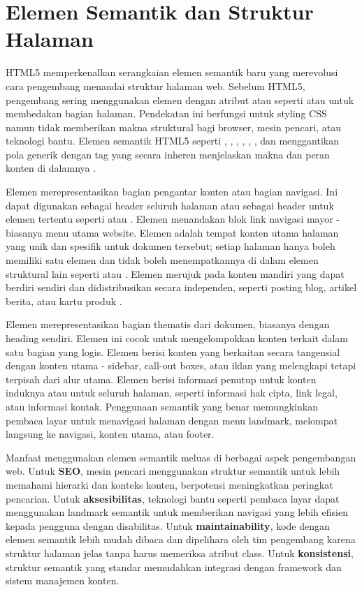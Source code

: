 ﻿\section{Elemen Semantik dan Struktur Halaman}

HTML5 memperkenalkan serangkaian elemen semantik baru yang merevolusi cara pengembang menandai struktur halaman web. Sebelum HTML5, pengembang sering menggunakan elemen  dengan atribut  atau  seperti  atau  untuk membedakan bagian halaman. Pendekatan ini berfungsi untuk styling CSS namun tidak memberikan makna struktural bagi browser, mesin pencari, atau teknologi bantu. Elemen semantik HTML5 seperti , , , , , , dan  menggantikan pola  generik dengan tag yang secara inheren menjelaskan makna dan peran konten di dalamnya \cite{webdevHtml}.

Elemen  merepresentasikan bagian pengantar konten atau bagian navigasi. Ini dapat digunakan sebagai header seluruh halaman atau sebagai header untuk elemen tertentu seperti  atau . Elemen  menandakan blok link navigasi mayor - biasanya menu utama website. Elemen  adalah tempat konten utama halaman yang unik dan spesifik untuk dokumen tersebut; setiap halaman hanya boleh memiliki satu elemen  dan tidak boleh menempatkannya di dalam elemen struktural lain seperti  atau . Elemen  merujuk pada konten mandiri yang dapat berdiri sendiri dan didistribusikan secara independen, seperti posting blog, artikel berita, atau kartu produk \cite{mdnAccessibility}.

Elemen  merepresentasikan bagian thematis dari dokumen, biasanya dengan heading sendiri. Elemen ini cocok untuk mengelompokkan konten terkait dalam satu bagian yang logis. Elemen  berisi konten yang berkaitan secara tangensial dengan konten utama - sidebar, call-out boxes, atau iklan yang melengkapi tetapi terpisah dari alur utama. Elemen  berisi informasi penutup untuk konten induknya atau untuk seluruh halaman, seperti informasi hak cipta, link legal, atau informasi kontak. Penggunaan semantik yang benar memungkinkan pembaca layar untuk menavigasi halaman dengan menu landmark, melompat langsung ke navigasi, konten utama, atau footer.

Manfaat menggunakan elemen semantik meluas di berbagai aspek pengembangan web. Untuk \textbf{SEO}, mesin pencari menggunakan struktur semantik untuk lebih memahami hierarki dan konteks konten, berpotensi meningkatkan peringkat pencarian. Untuk \textbf{aksesibilitas}, teknologi bantu seperti pembaca layar dapat menggunakan landmark semantik untuk memberikan navigasi yang lebih efisien kepada pengguna dengan disabilitas. Untuk \textbf{maintainability}, kode dengan elemen semantik lebih mudah dibaca dan dipelihara oleh tim pengembang karena struktur halaman jelas tanpa harus memeriksa atribut class. Untuk \textbf{konsistensi}, struktur semantik yang standar memudahkan integrasi dengan framework dan sistem manajemen konten.

